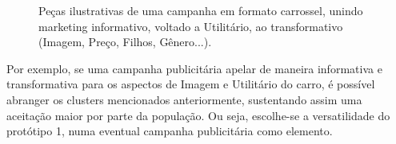 \begin{figure}
\begin{centering}
{\begin{centering}
\par\end{centering}
}
\par\end{centering}
\caption{Peças ilustrativas de uma campanha em formato carrossel, unindo marketing informativo, voltado a Utilitário, ao transformativo (Imagem, Preço, Filhos, Gênero...).}
\end{figure}


Por exemplo, se uma campanha publicitária apelar de maneira informativa
e transformativa para os aspectos de Imagem e Utilitário do carro,
é possível abranger os clusters mencionados anteriormente, sustentando
assim uma aceitação maior por parte da população. Ou seja, escolhe-se
a versatilidade do protótipo 1, numa eventual campanha publicitária
como elemento.

